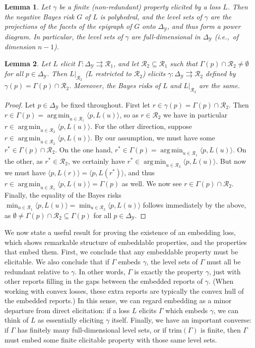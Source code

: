 \documentclass[11pt]{article}
\newcommand{\simplex}{\Delta_\Y}
\newcommand{\R}{\mathcal{R}}
\newcommand{\Y}{\mathcal{Y}}
\newcommand{\inprod}[2]{\langle #1, #2 \rangle}%
\newcommand{\toto}{\rightrightarrows}
\newcommand{\trim}{\mathrm{trim}}
\DeclareMathOperator*{\argmin}{arg\,min}
\newtheorem{lemma}{Lemma}
\begin{document}
\begin{lemma}\label{lem:finite-full-dim}
  Let $\gamma$ be a finite (non-redundant) property elicited by a loss $L$.
  Then the negative Bayes risk $G$ of $L$ is polyhedral, and the level sets of $\gamma$ are the projections of the facets of the epigraph of $G$ onto $\simplex$, and thus form a power diagram.
  In particular, the level sets of $\gamma$ are full-dimensional in $\simplex$ (i.e.,\ of dimension $n-1$).
\end{lemma}

\begin{lemma}\label{lem:loss-restrict}
  Let $L$ elicit $\Gamma:\simplex\toto\R_1$, and let $\R_2\subseteq\R_1$ such that $\Gamma(p) \cap \R_2 \neq \emptyset$ for all $p\in\simplex$.
  Then $L|_{\R_2}$ ($L$ restricted to $\R_2$) elicits $\gamma:\simplex\toto\R_2$ defined by $\gamma(p) = \Gamma(p)\cap \R_2$.
  Moreover, the Bayes risks of $L$ and $L|_{\R_2}$ are the same.
\end{lemma}
\begin{proof}
  Let $p\in\simplex$ be fixed throughout.
  First let $r \in \gamma(p) = \Gamma(p) \cap \R_2$.
  Then $r \in \Gamma(p) = \argmin_{u\in\R_1} \inprod{p}{L(u)}$, so as $r\in\R_2$ we have in particular $r \in \argmin_{u\in\R_2} \inprod{p}{L(u)}$.
  For the other direction, suppose $r \in \argmin_{u\in\R_2} \inprod{p}{L(u)}$.
  By our assumption, we must have some $r^* \in \Gamma(p) \cap \R_2$.
  On the one hand, $r^*\in\Gamma(p) = \argmin_{u\in\R_1} \inprod{p}{L(u)}$.
  On the other, as $r^* \in \R_2$, we certainly have $r^* \in \argmin_{u\in\R_2} \inprod{p}{L(u)}$.
  But now we must have $\inprod{p}{L(r)} = \inprod{p}{L(r^*)}$, and thus $r \in \argmin_{u\in\R_1} \inprod{p}{L(u)} = \Gamma(p)$ as well.
  We now see $r \in \Gamma(p) \cap \R_2$.
  Finally, the equality of the Bayes risks $\min_{u\in\R_1} \inprod{p}{L(u)} = \min_{u\in\R_2} \inprod{p}{L(u)}$ follows immediately by the above, as $\emptyset \neq \Gamma(p)\cap\R_2 \subseteq \Gamma(p)$ for all $p\in\simplex$.
\end{proof}

We now state a useful result for proving the existence of an embedding loss, which shows remarkable structure of embeddable properties, and the properties that embed them.
First, we conclude that any embeddable property must be elicitable.
We also conclude that if $\Gamma$ embeds $\gamma$, the level sets of $\Gamma$ must all be redundant relative to $\gamma$.
In other words, $\Gamma$ is exactly the property $\gamma$, just with other reports filling in the gaps between the embedded reports of $\gamma$.
(When working with convex losses, these extra reports are typically the convex hull of the embedded reports.)
In this sense, we can regard embedding as a minor departure from direct elicitation: if a loss $L$ elicits $\Gamma$ which embeds $\gamma$, we can think of $L$ as essentially eliciting $\gamma$ itself.
Finally, we have an important converse: if $\Gamma$ has finitely many full-dimensional level sets, or if $\trim(\Gamma)$ is finite, then $\Gamma$ must embed some finite elicitable property with those same level sets.
\end{document}
